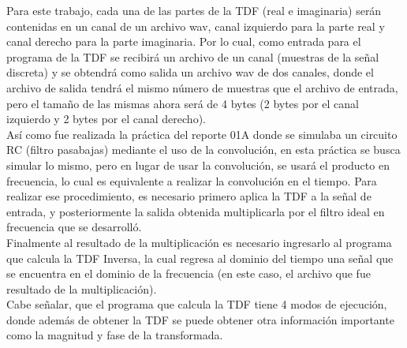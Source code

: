 Para este trabajo, cada una de las partes de la TDF (real e imaginaria) serán contenidas en un canal de un archivo wav, canal izquierdo para la parte real y canal derecho para la parte imaginaria. Por lo cual, como entrada para el programa de la TDF se recibirá un archivo de un canal (muestras de la señal discreta) y se obtendrá como salida un archivo wav de dos canales, donde el archivo de salida tendrá el mismo número de muestras que el archivo de entrada, pero el tamaño de las mismas ahora será de 4 bytes (2 bytes por el canal izquierdo y 2 bytes por el canal derecho).\\ 
Así como fue realizada la práctica del reporte 01A donde se simulaba un circuito RC (filtro pasabajas) mediante el uso de la convolución, en esta práctica se busca simular lo mismo, pero en lugar de usar la convolución, se usará el producto en frecuencia, lo cual es equivalente a realizar la convolución en el tiempo. Para realizar ese procedimiento, es necesario primero aplica la TDF a la señal de entrada, y posteriormente la salida obtenida multiplicarla por el filtro ideal en frecuencia que se desarrolló.\\ Finalmente al resultado de la multiplicación es necesario ingresarlo al programa que calcula la TDF Inversa, la cual regresa al dominio del tiempo una señal que se encuentra en el dominio de la frecuencia (en este caso, el archivo que fue resultado de la multiplicación).\\ Cabe señalar, que el programa que calcula la TDF tiene 4 modos de ejecución, donde además de obtener la TDF se puede obtener otra información importante como la magnitud y fase de la transformada.
